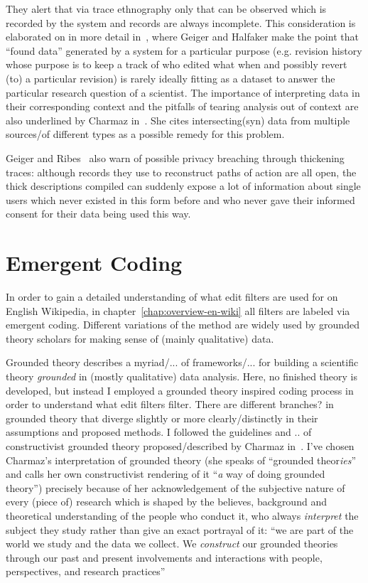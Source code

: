 They alert that via trace ethnography only that can be observed which is recorded by the system and records are always incomplete.
This consideration is elaborated on in more detail in~\cite{GeiHal2017}, where Geiger and Halfaker make the point that ``found data'' generated by a system for a particular purpose (e.g. revision history whose purpose is to keep a track of who edited what when and possibly revert (to) a particular revision) is rarely ideally fitting as a dataset to answer the particular research question of a scientist.
The importance of interpreting data in their corresponding context and the pitfalls of tearing analysis out of context are also underlined by Charmaz in~\cite{Charmaz2006}.
She cites intersecting(syn) data from multiple sources/of different types as a possible remedy for this problem. %

Geiger and Ribes~\cite{GeiRib2011} also warn of possible privacy breaching through thickening traces:
although records they use to reconstruct paths of action are all open, the thick descriptions compiled can suddenly expose a lot of information about single users which never existed in this form before and who never gave their informed consent for their data being used this way.


\section{Emergent Coding}
\label{sec:gt}

In order to gain a detailed understanding of what edit filters are used for on English Wikipedia, in chapter~\ref{chap:overview-en-wiki} all filters are labeled via emergent coding.
Different variations of the method are widely used by grounded theory scholars for making sense of (mainly qualitative) data.

Grounded theory describes a myriad/... of frameworks/... for building a scientific theory \emph{grounded} in (mostly qualitative) data analysis.
Here, no finished theory is developed, but instead I employed a grounded theory inspired coding process in order to understand what edit filters filter.
There are different branches? in grounded theory that diverge slightly or more clearly/distinctly in their assumptions and proposed methods.
I followed the guidelines and .. of constructivist grounded theory proposed/described by Charmaz in~\cite{Charmaz2006}.
I've chosen Charmaz's interpretation of grounded theory (she speaks of ``grounded theor\emph{ies}'' and calls her own constructivist rendering of it ``\emph{a} way of doing grounded theory'') precisely because of her acknowledgement of the subjective nature of every (piece of) research which is shaped by the believes, background and theoretical understanding of the people who conduct it, who always \emph{interpret} the subject they study rather than give an exact portrayal of it:
``we are part of the world we study and the data we collect. We \textit{construct} our grounded theories through our past and present involvements and interactions with people, perspectives, and research practices''~\cite[p.10]{Charmaz2006}

